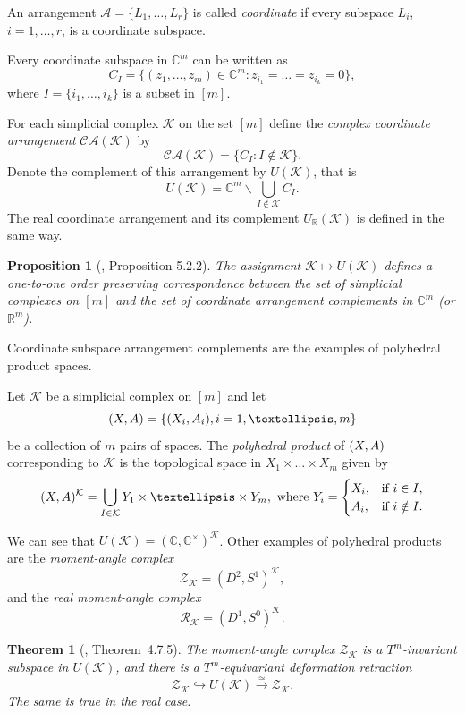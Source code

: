 \documentclass[a4paper,12pt]{amsart}
\newcommand{\K}{\mathcal K}
\newcommand{\RR}{\mathbb R}
\newcommand{\CC}{\mathbb C}
\newcommand{\Z}{\mathcal Z}
\newcommand{\R}{\mathcal R}
\newtheorem{theorem}[formula]{Theorem}
\newtheorem{proposition}[formula]{Proposition}
\theoremstyle{definition}
\theoremstyle{remark}
\numberwithin{equation}{section}
\begin{document}
An arrangement 
$\mathcal{A} = \{L_1, \dots, L_r \}$ is called \textit{coordinate}
if every subspace
$L_i$, $i = 1, \dots, r$, is a coordinate subspace.

Every coordinate subspace in $\CC^m$ can be written as
	$$C_I = \{(z_1, \dots, z_m) \in \CC^m : z_{i_1} = \dots = z_{i_k} = 0 \}, $$
where $I = \{i_1, \dots, i_k \}$ is a subset in $[m]$.

For each simplicial complex $\K$ on the set $[m]$ define the \textit{complex coordinate arrangement}
$\mathcal{CA}(\K)$ by
	$$\mathcal{CA}(\K) = \{C_I : I \notin \K \}.$$
Denote the complement of this arrangement by $U(\K)$, that is
	$$U(\K) = \CC^m \backslash \bigcup_{I \notin \K} C_I.$$
The real coordinate arrangement and its complement $U_\RR(\K)$ is defined in the same way.
\begin{proposition}[\cite{BP00}, Proposition 5.2.2]
	The assignment
	$\K \mapsto U(\K)$ defines a one-to-one order preserving correspondence between the set of simplicial complexes on $[m]$
	and the set of coordinate arrangement complements in $\CC^m$ (or $\RR^m$).
\end{proposition}
Coordinate subspace arrangement complements are the examples of polyhedral product spaces.

Let $\K$ be a simplicial complex on $[m]$ and let
$$(\textit{\textbf X}, \textit{\textbf A}) = \{ (X_i, A_i), i = 1, \dots, m \}$$
be a collection of $m$ pairs of spaces.
The \textit{polyhedral product} of $(\textit{\textbf X}, \textit{\textbf A})$ corresponding to $\K$ 
is the topological space in $X_1 \times \dots \times X_m$ given by
$$(\textit{\textbf X}, \textit{\textbf A})^\K = \bigcup_{I \in \K} Y_1 \times \dots \times Y_m,
\text{ where } Y_i = \begin{cases} X_i, &\text{if } i \in I,\\ A_i, &\text{if } i \notin I. \end{cases}$$

We can see that $U(\K) = (\CC, \CC^\times)^\K$. 
Other examples of polyhedral products are the \textit{moment-angle complex}
$$\Z_\K = (D^2, S^1)^\K,$$
and the \textit{real moment-angle complex}
$$\R_\K = (D^1, S^0)^\K.$$
\begin{theorem}[\cite{BP}, Theorem~4.7.5]
	The moment-angle complex $\Z_\K$ is a $T^m$-invariant subspace in $U(\K)$, and there is a $T^m$-equivariant 
	deformation retraction
	$$\Z_\K \hookrightarrow U(\K) \stackrel{\simeq}{\to} \Z_\K.$$
	The same is true in the real case.
\end{theorem}
\end{document}
